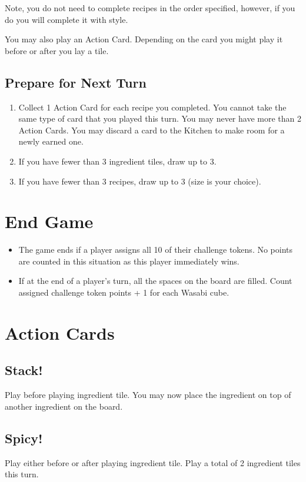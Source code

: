 \documentclass[12pt]{article}
\newenvironment{enumerateCustom}
{\begin{enumerate}
  \setlength{\itemsep}{1pt}
  \setlength{\parskip}{0pt}
  \setlength{\parsep}{0pt}}
{\end{enumerate}}
\newenvironment{itemizeCustom}
{\begin{itemize}
  \setlength{\itemsep}{1pt}
  \setlength{\parskip}{0pt}
  \setlength{\parsep}{0pt}}
{\end{itemize}}
\begin{document}
\begin{mdframed}[style = customFrame]
\begin{multicols*}{2}
Note, you do not need to complete recipes in the order specified, however, if you do you will complete it with style.

You may also play an Action Card. Depending on the card you might play it before or after you lay a tile.

\subsection*{Prepare for Next Turn}
\begin{enumerateCustom}
    \item Collect 1 Action Card for each recipe you completed. You cannot take the same type of card that you played this turn. You may never have more than 2 Action Cards. You may discard a card to the Kitchen to make room for a newly earned one.
    \item If you have fewer than 3 ingredient tiles, draw up to 3.
    \item If you have fewer than 3 recipes, draw up to 3 (size is your choice).
\end{enumerateCustom}

\section*{End Game}
\begin{itemizeCustom}
    \item The game ends if a player assigns all 10 of their challenge tokens. No points are counted in this situation as this player immediately wins. 
    \item If at the end of a player's turn, all the spaces on the board are filled. Count assigned challenge token points + 1 for each Wasabi cube.
\end{itemizeCustom}

\section*{Action Cards}
\subsection*{Stack!}
Play before playing ingredient tile. You may now place the ingredient on top of another ingredient on the board.

\subsection*{Spicy!}
Play either before or after playing ingredient tile. Play a total of 2 ingredient tiles this turn.


\end{multicols*}
\end{mdframed}
\end{document}
